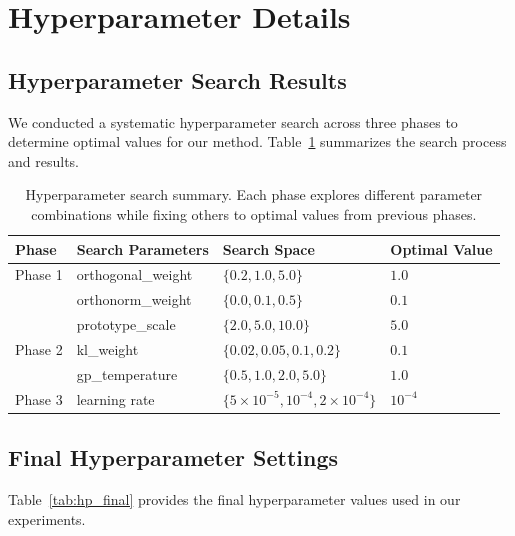 \section{Hyperparameter Details}
\label{app:hyperparameters}

\subsection{Hyperparameter Search Results}

We conducted a systematic hyperparameter search across three phases to determine optimal values for our method. Table~\ref{tab:hpsearch} summarizes the search process and results.

\begin{table}[h]
\centering
\caption{Hyperparameter search summary. Each phase explores different parameter combinations while fixing others to optimal values from previous phases.}
\label{tab:hpsearch}
\small
\begin{tabular}{llll}
\toprule
\textbf{Phase} & \textbf{Search Parameters} & \textbf{Search Space} & \textbf{Optimal Value} \\
\midrule
Phase 1 & orthogonal\_weight & $\{0.2, 1.0, 5.0\}$ & $1.0$ \\
         & orthonorm\_weight & $\{0.0, 0.1, 0.5\}$ & $0.1$ \\
         & prototype\_scale & $\{2.0, 5.0, 10.0\}$ & $5.0$ \\
\midrule
Phase 2 & kl\_weight & $\{0.02, 0.05, 0.1, 0.2\}$ & $0.1$ \\
         & gp\_temperature & $\{0.5, 1.0, 2.0, 5.0\}$ & $1.0$ \\
\midrule
Phase 3 & learning rate & $\{5 \times 10^{-5}, 10^{-4}, 2 \times 10^{-4}\}$ & $10^{-4}$ \\
\bottomrule
\end{tabular}
\end{table}

\subsection{Final Hyperparameter Settings}

Table~\ref{tab:hp_final} provides the final hyperparameter values used in our experiments.

